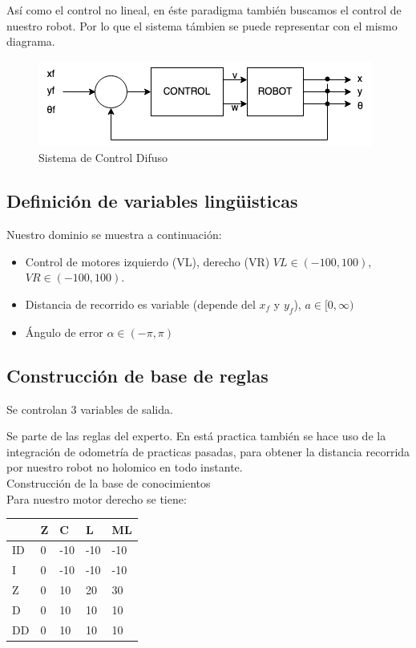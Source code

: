 \documentclass[oneside,onecolumn]{article}
\begin{document}
Así como el control no lineal, en éste paradigma también buscamos el control de nuestro robot. Por lo que el sistema támbien se puede representar con el mismo diagrama.

\begin{figure}[h]
  \centering
  \includegraphics[scale=0.7]{graficos/bloque.png}
  \caption{Sistema de Control Difuso}
\end{figure}

\subsection{Definición de variables lingüisticas}

Nuestro dominio se muestra a continuación:
\begin{itemize}
\item Control de motores izquierdo (VL), derecho (VR) $VL \in (-100,100)$, $VR \in (-100,100)$.
\item Distancia de recorrido es variable (depende del $x_f$ y $y_f$), $a \in [0, \infty)$
\item Ángulo de error $\alpha \in (-\pi, \pi)$
\end{itemize}

\subsection{Construcción de base de reglas}

Se controlan 3 variables de salida.

Se parte de las reglas del experto. En está practica también se hace uso de la integración de odometría de practicas pasadas, para obtener la distancia recorrida por nuestro robot no holomico en todo instante.\\

Construcción de la base de conocimientos\\

Para nuestro motor derecho se tiene:
\begin{table}[h]
\centering
\begin{tabular}{l|l|l|l|l|}
\cline{2-5}
                         & Z & C   & L   & ML  \\ \hline
\multicolumn{1}{|l|}{ID} & 0 & -10 & -10 & -10 \\ \hline
\multicolumn{1}{|l|}{I}  & 0 & -10 & -10 & -10 \\ \hline
\multicolumn{1}{|l|}{Z}  & 0 & 10  & 20  & 30  \\ \hline
\multicolumn{1}{|l|}{D}  & 0 & 10  & 10  & 10  \\ \hline
\multicolumn{1}{|l|}{DD} & 0 & 10  & 10  & 10  \\ \hline
\end{tabular}
\end{table}
\end{document}
